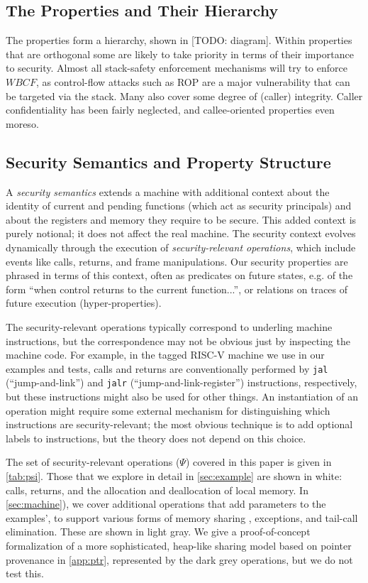 \subsection{The Properties and Their Hierarchy}

The properties form a hierarchy, shown in [TODO: diagram].
Within properties that are orthogonal
some are likely to take priority in terms of their
importance to security. Almost all stack-safety enforcement mechanisms will try to enforce \(WBCF\),
as control-flow attacks such as ROP are a major vulnerability that can be targeted via the stack.
Many also cover some degree of (caller) integrity. Caller confidentiality has been fairly neglected,
and callee-oriented properties even moreso.

\subsection{Security Semantics and Property Structure}

A {\em security semantics} extends a machine
with additional context about the identity of current and pending
functions (which act as security principals) and about the registers and memory they require
to be secure. This added context is purely notional;
it does not affect the real machine. The security context
evolves dynamically through the execution of {\em security-relevant operations},
which include events like calls, returns, and frame manipulations.
Our security properties are phrased in terms of this context, often as predicates
on future states, e.g. of the form ``when control returns to the current function...'',
or relations on traces of future execution (hyper-properties).

The security-relevant operations typically correspond to underling machine instructions,
but the correspondence may not be obvious just by inspecting the machine code.
For example, in the tagged RISC-V machine we use in our examples and tests,
calls and returns are conventionally performed by {\tt jal} (``jump-and-link'')
and {\tt jalr} (``jump-and-link-register'') instructions, respectively, but these
instructions might also be used for other things. An instantiation of an operation
might require some external mechanism for distinguishing which instructions are
security-relevant; the most obvious technique is to add optional labels to instructions,
but the theory does not depend on this choice.

The set of security-relevant operations (\(\Psi\)) covered in this paper is given in
\cref{tab:psi}. Those that we explore in detail in \cref{sec:example}
are shown in white: calls, returns, and the allocation and deallocation of local memory.
In \cref{sec:machine}), we cover additional operations that add parameters to the examples',
to support various forms of memory sharing \ifexceptions , exceptions, \fi
and tail-call elimination. These are shown in light gray.
We give a proof-of-concept formalization of a more sophisticated, heap-like sharing model
based on pointer provenance in \cref{app:ptr}, represented by the dark grey
operations, but we do not test this.

